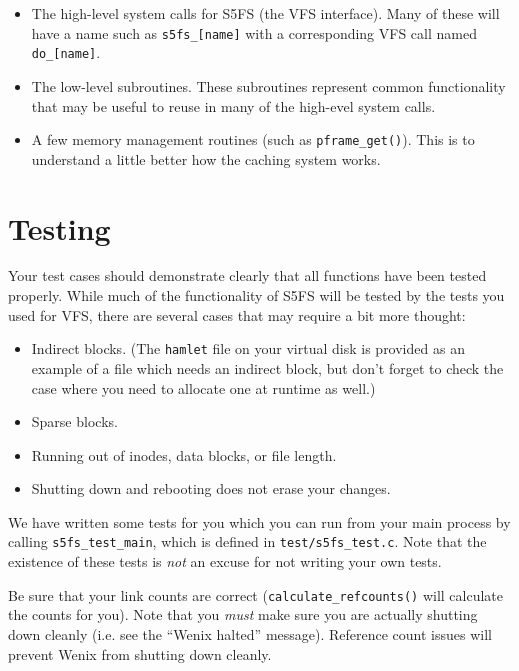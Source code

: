\begin{itemize}

\item The high-level system calls for S5FS (the VFS interface).  Many of these will have a name such as \texttt{s5fs\_[name]} with a corresponding VFS call named \texttt{do\_[name]}.

\item The low-level subroutines.  These subroutines represent common functionality that may be useful to reuse in many of the high-evel system calls.

\item A few memory management routines (such as \texttt{pframe\_get()}).  This is to understand a little better how the caching system works.

\end{itemize}

\section{Testing}

Your test cases should demonstrate clearly that all functions have been tested properly. While much of the functionality of S5FS will be tested by the tests you used for VFS, there are several cases that may require a bit more thought:

\begin{itemize}
    \item Indirect blocks. (The \texttt{hamlet} file on your virtual disk is provided as an example of a file which needs an indirect block, but don't forget to check the case where you need to allocate one at runtime as well.)
    \item Sparse blocks.
    \item Running out of inodes, data blocks, or file length.
    \item Shutting down and rebooting does not erase your changes.
\end{itemize}

We have written some tests for you which you can run from your main process by
calling \texttt{s5fs\_test\_main}, which is defined in \texttt{test/s5fs\_test.c}. Note that the existence of these tests is \emph{not} an excuse for not writing your own tests.

Be sure that your link counts are correct (\texttt{calculate\_refcounts()} will calculate the counts for you). Note that you \emph{must} make sure you are actually shutting down cleanly (i.e. see the ``Wenix halted'' message). Reference count issues will prevent Wenix from shutting down cleanly.

